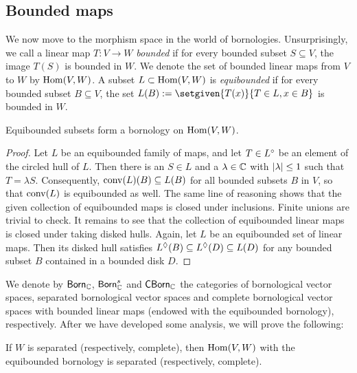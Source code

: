 \subsection{Bounded maps}

We now move to the morphism space in the world of bornologies. Unsurprisingly, we call a linear map \(T \colon V \to W\) \textit{bounded} if for every bounded subset \(S \subseteq V\), the image \(T(S)\) is bounded in \(W\). 
We denote the set of bounded linear maps from \(V\) to \(W\) by \(\operatorname{Hom}(V,W)\). A subset $L \subset \operatorname{Hom}(V,W)$
is \emph{equibounded} if for every 
bounded subset \(B \subseteq V\), the set \(L(B) \defeq \setgiven{T(x)}{T \in L, x \in B}\) 
is bounded in \(W\).

\begin{lemma} \label{lem:equi-born}
    Equibounded subsets form a bornology on \(\operatorname{Hom}(V,W)\).
\end{lemma}
\begin{proof}
    Let \(L\) be an equibounded family of maps, 
    and let \(T \in L^\circ\) be an element of the circled hull of \(L\). 
    Then there is an \(S \in L\) and a \(\lambda \in \mathbb C\) with 
    \(\lvert\lambda\rvert \leq 1\) such that \(T = \lambda S\). Consequently, 
    \(\operatorname{conv}(L)(B) \subseteq L(B)\) for all bounded subsets 
    \(B\) in \(V\), so that \(\operatorname{conv}(L)\) is equibounded as well. 
    The same line of reasoning shows that the given collection of 
    equibounded maps is closed under inclusions. Finite unions are trivial to check. 
    It remains to see that the collection of equibounded linear maps is closed under 
    taking disked hulls. Again, let \(L\) be an equibounded set of linear maps. Then its
    disked hull satisfies \(L^\lozenge(B) \subseteq L^\lozenge(D) \subseteq L(D)\) for any 
    bounded subset \(B\) contained in a bounded disk \(D\).  
\end{proof}

We denote by \(\mathsf{Born}_\mathbb C\), \(\mathsf{Born}_\mathbb C^s\) and \(\mathsf{CBorn}_\mathbb C\) the categories 
of bornological vector spaces, separated bornological vector spaces and complete bornological vector 
spaces with bounded linear maps (endowed with the equibounded bornology), respectively. After we have 
developed some analysis, we will prove the following:

\begin{lemma}
    If \(W\) is separated (respectively, complete), then \(\operatorname{Hom}(V,W)\) with the equibounded bornology is separated (respectively, complete). 
\end{lemma}